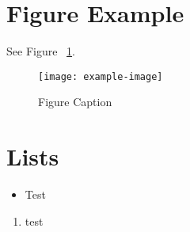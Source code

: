 \documentclass{jdf}
\begin{document}
\section*{Figure Example}
\lipsum[1] See Figure ~\ref{fig::1}.
\begin{figure}[H]
\centering
\texttt{[image: example-image]}
\caption{Figure Caption}
\label{fig::1}
\end{figure}

\section*{Lists}
\begin{itemize}[leftmargin=.5in]
\item Test
\end{itemize}

\begin{enumerate}[leftmargin=.5in]
\item test \cite{test}
\end{enumerate}



\end{document}
